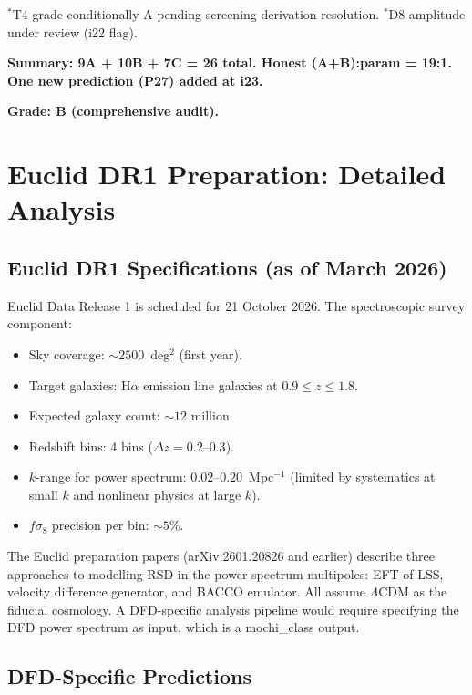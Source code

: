 \documentclass[11pt]{article}
\newcommand{\LCDM}{$\Lambda$CDM}
\begin{document}
\begin{tcolorbox}[colback=blue!5!white, colframe=blue!70!black,
  title=\textbf{W4i23 TOP 5 FINDINGS --- PREDICTIONS TEAM}]
\begin{enumerate}
  $^*$T4 grade conditionally A pending screening derivation resolution.
  $^*$D8 amplitude under review (i22 flag).

  \textbf{Summary: 9A + 10B + 7C = 26 total.  Honest (A+B):param
  = 19:1.  One new prediction (P27) added at i23.}

  \textbf{Grade: B (comprehensive audit).}

\end{enumerate}
\end{tcolorbox}

\section{Euclid DR1 Preparation: Detailed Analysis}
\label{sec:euclid}

\subsection{Euclid DR1 Specifications (as of March 2026)}

Euclid Data Release 1 is scheduled for 21 October 2026.  The
spectroscopic survey component:
\begin{itemize}
\item Sky coverage: $\sim 2500$~deg$^2$ (first year).
\item Target galaxies: H$\alpha$ emission line galaxies at
  $0.9 \leq z \leq 1.8$.
\item Expected galaxy count: $\sim 12$ million.
\item Redshift bins: 4 bins ($\Delta z = 0.2$--$0.3$).
\item $k$-range for power spectrum: $0.02$--$0.20$~Mpc$^{-1}$
  (limited by systematics at small $k$ and nonlinear physics at
  large $k$).
\item $f\sigma_8$ precision per bin: $\sim 5$\%.
\end{itemize}

The Euclid preparation papers (arXiv:2601.20826 and earlier) describe
three approaches to modelling RSD in the power spectrum multipoles:
EFT-of-LSS, velocity difference generator, and BACCO emulator.  All
assume \LCDM{} as the fiducial cosmology.  A DFD-specific analysis
pipeline would require specifying the DFD power spectrum as input,
which is a mochi\_class output.

\subsection{DFD-Specific Predictions}
\end{document}
